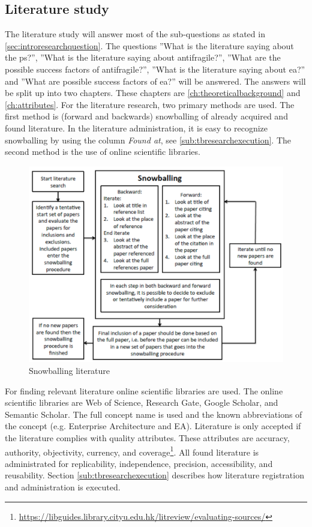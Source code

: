 \subsection{Literature study}
\label{sub:literaturestudy}
The literature study will answer most of the sub-questions as stated in \cref{sec:introresearchquestion}. The questions ''What is the literature saying about the \gls{ps}?'', ''What is the literature saying about \gls{antifragile}?'', ''What are the possible success factors of \gls{antifragile}?'', ''What is the literature saying about \acrlong{ea}?'' and ''What are possible success factors of \acrlong{ea}?'' will be answered. The answers will be split up into two chapters. These chapters are \cref{ch:theoreticalbackground} and \cref{ch:attributes}. For the literature research, two primary methods are used. The first method is (forward and backwards) snowballing of already acquired and found literature. In the literature administration, it is easy to recognize snowballing by using the column \textit{Found at}, see \cref{sub:tbresearchexecution}. The second method is the use of online scientific libraries.
\begin{figure}[H]
	\centering
	\includegraphics[width=0.6\linewidth]{images/snowball}
	\caption[Snowballing literature]{Snowballing literature \parencite{Wohlin2014}}
	\label{fig:snowball}
\end{figure}
For finding relevant literature online scientific libraries are used. The online scientific libraries are Web of Science, Research Gate, Google Scholar, and Semantic Scholar. The full concept name is used and the known abbreviations of the concept (e.g. Enterprise Architecture and EA). Literature is only accepted if the literature complies with quality attributes. These attributes are accuracy, authority, objectivity, currency, and coverage\footnote{\url{https://libguides.library.cityu.edu.hk/litreview/evaluating-sources/}}. All found literature is administrated for replicability, independence, precision, accessibility, and reusability. Section \ref{sub:tbresearchexecution} describes how literature registration and administration is executed.
